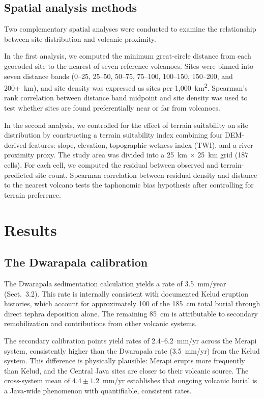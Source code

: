 \documentclass[12pt,a4paper]{article}
\begin{document}
\subsection{Spatial analysis methods}

Two complementary spatial analyses were conducted to examine the relationship between site distribution and volcanic proximity.

In the first analysis, we computed the minimum great-circle distance from each geocoded site to the nearest of seven reference volcanoes. Sites were binned into seven distance bands (0--25, 25--50, 50--75, 75--100, 100--150, 150--200, and 200+~km), and site density was expressed as sites per 1,000~km\textsuperscript{2}. Spearman's rank correlation between distance band midpoint and site density was used to test whether sites are found preferentially near or far from volcanoes.

In the second analysis, we controlled for the effect of terrain suitability on site distribution by constructing a terrain suitability index combining four DEM-derived features: slope, elevation, topographic wetness index (TWI), and a river proximity proxy. The study area was divided into a 25~km $\times$ 25~km grid (187 cells). For each cell, we computed the residual between observed and terrain-predicted site count. Spearman correlation between residual density and distance to the nearest volcano tests the taphonomic bias hypothesis after controlling for terrain preference.


\section{Results}

\subsection{The Dwarapala calibration}

The Dwarapala sedimentation calculation yields a rate of 3.5~mm/year (Sect.~3.2). This rate is internally consistent with documented Kelud eruption histories, which account for approximately 100 of the 185~cm total burial through direct tephra deposition alone. The remaining 85~cm is attributable to secondary remobilization and contributions from other volcanic systems.

The secondary calibration points yield rates of 2.4--6.2~mm/yr across the Merapi system, consistently higher than the Dwarapala rate (3.5~mm/yr) from the Kelud system. This difference is physically plausible: Merapi erupts more frequently than Kelud, and the Central Java sites are closer to their volcanic source. The cross-system mean of $4.4 \pm 1.2$~mm/yr establishes that ongoing volcanic burial is a Java-wide phenomenon with quantifiable, consistent rates.
\end{document}
